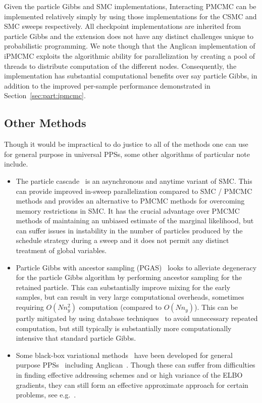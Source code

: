 Given the particle Gibbs and SMC implementations, Interacting PMCMC can be implemented
relatively simply by using those implementations for the CSMC and SMC sweeps respectively.
All checkpoint implementations are inherited from particle Gibbs and the extension does
not have any distinct challenges unique to probabilistic programming.  We note though that
the Anglican implementation of iPMCMC exploits the algorithmic ability for parallelization 
by creating a pool of threads to distribute computation of the different nodes.   Consequently,
the implementation has substantial computational benefits over say particle Gibbs, in addition
to the improved per-sample performance demonstrated in Section~\ref{sec:part:ipmcmc}.

\subsection{Other Methods}
\label{sec:proginf:str:part:other}

Though it would be impractical to do justice to all of the methods one can use for general
purpose in universal PPSs, some other algorithms of particular note include.

\begin{itemize}
	\item The particle cascade~\citep{paige2014asynchronous} is an asynchronous and anytime
	variant of SMC.  This can provide improved in-sweep parallelization compared to SMC / PMCMC
	methods and provides an alternative to PMCMC methods for overcoming memory restrictions in
	SMC.  It has the crucial advantage over PMCMC methods of maintaining an unbiased estimate
	of the marginal likelihood, but can suffer issues in instability in the number of particles produced
	by the schedule strategy during a sweep and it does not permit any distinct treatment of global
	variables.
	\item Particle Gibbs with ancestor sampling (PGAS)~\citep{lindstenJS2014,vandemeent_aistats_2015}
	looks to alleviate degeneracy for the particle Gibbs algorithm by performing ancestor sampling
	for the retained particle.  This can substantially improve mixing for the early samples, but can
	result in very large computational overheads, sometimes requiring $O(Nn_y^2)$ computation
	(compared to $O(Nn_y)$).  This can be partly 
	mitigated by using database techniques~\cite{vandemeent_aistats_2015} to avoid unnecessary
	repeated computation, but still typically is substantially more computationally intensive that
	standard particle Gibbs.  
	\item Some black-box variational methods~\citep{ranganath_aistats_2014,kucukelbir2015automatic} 
	have been developed for general purpose PPSs~\citep{wingate2013automated} including Anglican~\cite{vandemeent2016black,paige2017thesis}.  Though these can suffer from difficulties
	in finding effective addressing schemes and or high variance of the ELBO gradients, they can still
	form an effective approximate approach for certain problems, see e.g.~\citep{paige2017thesis}.
\end{itemize}

